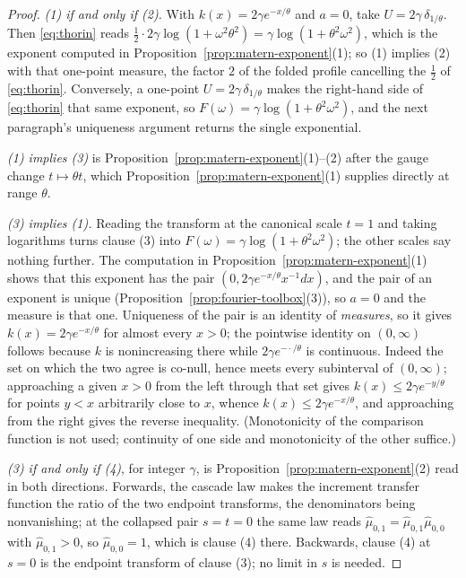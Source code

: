 \begin{proof}
\emph{(1) if and only if (2).} With $k(x) = 2\gamma e^{-x/\theta}$ and $a = 0$, take
$U = 2\gamma\,\delta_{1/\theta}$. Then \ref{eq:thorin} reads
$\tfrac12\cdot 2\gamma\log(1 + \omega^2\theta^2) = \gamma\log(1+\theta^2\omega^2)$, which is the
exponent computed in Proposition~\ref{prop:matern-exponent}(1); so (1) implies (2) with that
one-point measure, the factor $2$ of the folded profile cancelling the $\tfrac12$ of
\ref{eq:thorin}. Conversely, a one-point $U = 2\gamma\,\delta_{1/\theta}$ makes the right-hand
side of \ref{eq:thorin} that same exponent, so $F(\omega) = \gamma\log(1+\theta^2\omega^2)$, and
the next paragraph's uniqueness argument returns the single exponential.

\emph{(1) implies (3)} is Proposition~\ref{prop:matern-exponent}(1)--(2) after the gauge change
$t \mapsto \theta t$, which Proposition~\ref{prop:matern-exponent}(1) supplies directly at range
$\theta$.

\emph{(3) implies (1).} Reading the transform at the canonical scale $t = 1$ and taking
logarithms turns clause (3) into $F(\omega) = \gamma\log(1+\theta^2\omega^2)$; the other scales
say nothing further. The computation in Proposition~\ref{prop:matern-exponent}(1) shows that
this exponent has the pair $(0, 2\gamma e^{-x/\theta}x^{-1}dx)$, and the pair of an exponent is
unique (Proposition~\ref{prop:fourier-toolbox}(3)), so $a = 0$ and the \Levy{} measure is that
one. Uniqueness of the pair is an identity of \emph{measures}, so it gives
$k(x) = 2\gamma e^{-x/\theta}$ for almost every $x > 0$; the pointwise identity on $(0,\infty)$
follows because $k$ is nonincreasing there while $2\gamma e^{-\cdot/\theta}$ is continuous.
Indeed the set on which the two agree is co-null, hence meets every subinterval of $(0,\infty)$;
approaching a given $x > 0$ from the left through that set gives
$k(x) \le 2\gamma e^{-y/\theta}$ for points $y < x$ arbitrarily close to $x$, whence
$k(x) \le 2\gamma e^{-x/\theta}$, and approaching from the right gives the reverse inequality.
(Monotonicity of the comparison function is not used; continuity of one side and monotonicity
of the other suffice.)

\emph{(3) if and only if (4)}, for integer $\gamma$, is Proposition~\ref{prop:matern-exponent}(2)
read in both directions. Forwards, the cascade law makes the increment transfer function the
ratio of the two endpoint transforms, the denominators being nonvanishing; at the collapsed pair
$s = t = 0$ the same law reads $\hat\mu_{0,1} = \hat\mu_{0,1}\hat\mu_{0,0}$ with
$\hat\mu_{0,1} > 0$, so $\hat\mu_{0,0} = 1$, which is clause (4) there. Backwards, clause (4) at
$s = 0$ is the endpoint transform of clause (3); no limit in $s$ is needed.
\end{proof}


